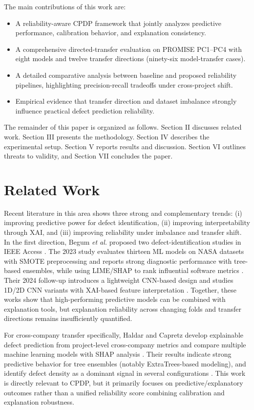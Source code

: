 \documentclass[conference]{IEEEtran}
\begin{document}
The main contributions of this work are:
\begin{itemize}
\item A reliability-aware CPDP framework that jointly analyzes predictive performance, calibration behavior, and explanation consistency.
\item A comprehensive directed-transfer evaluation on PROMISE PC1--PC4 with eight models and twelve transfer directions (ninety-six model-transfer cases).
\item A detailed comparative analysis between baseline and proposed reliability pipelines, highlighting precision-recall tradeoffs under cross-project shift.
\item Empirical evidence that transfer direction and dataset imbalance strongly influence practical defect prediction reliability.
\end{itemize}

The remainder of this paper is organized as follows. Section II discusses related work. Section III presents the methodology. Section IV describes the experimental setup. Section V reports results and discussion. Section VI outlines threats to validity, and Section VII concludes the paper.

\section{Related Work}
Recent literature in this area shows three strong and complementary trends: (i) improving predictive power for defect identification, (ii) improving interpretability through XAI, and (iii) improving reliability under imbalance and transfer shift. In the first direction, Begum \emph{et al.} proposed two defect-identification studies in IEEE Access \cite{r1,r2}. The 2023 study evaluates thirteen ML models on NASA datasets with SMOTE preprocessing and reports strong diagnostic performance with tree-based ensembles, while using LIME/SHAP to rank influential software metrics \cite{r1}. Their 2024 follow-up introduces a lightweight CNN-based design and studies 1D/2D CNN variants with XAI-based feature interpretation \cite{r2}. Together, these works show that high-performing predictive models can be combined with explanation tools, but explanation reliability across changing folds and transfer directions remains insufficiently quantified.

For cross-company transfer specifically, Haldar and Capretz develop explainable defect prediction from project-level cross-company metrics and compare multiple machine learning models with SHAP analysis \cite{r3}. Their results indicate strong predictive behavior for tree ensembles (notably ExtraTrees-based modeling), and identify defect density as a dominant signal in several configurations \cite{r3}. This work is directly relevant to CPDP, but it primarily focuses on predictive/explanatory outcomes rather than a unified reliability score combining calibration and explanation robustness.
\end{document}
